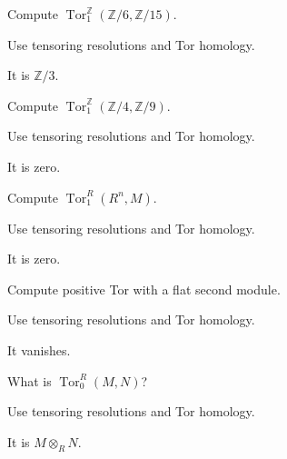 \begin{exercise}\label{exr:v26-expand-01}
Compute $\operatorname{Tor}_1^{\mathbb Z}(\mathbb Z/6,\mathbb Z/15)$.
\end{exercise}
\begin{hint}
Use tensoring resolutions and Tor homology.
\end{hint}
\begin{solution}
It is $\mathbb Z/3$.
\end{solution}

\begin{exercise}\label{exr:v26-expand-02}
Compute $\operatorname{Tor}_1^{\mathbb Z}(\mathbb Z/4,\mathbb Z/9)$.
\end{exercise}
\begin{hint}
Use tensoring resolutions and Tor homology.
\end{hint}
\begin{solution}
It is zero.
\end{solution}

\begin{exercise}\label{exr:v26-expand-03}
Compute $\operatorname{Tor}_1^R(R^n,M)$.
\end{exercise}
\begin{hint}
Use tensoring resolutions and Tor homology.
\end{hint}
\begin{solution}
It is zero.
\end{solution}

\begin{exercise}\label{exr:v26-expand-04}
Compute positive Tor with a flat second module.
\end{exercise}
\begin{hint}
Use tensoring resolutions and Tor homology.
\end{hint}
\begin{solution}
It vanishes.
\end{solution}

\begin{exercise}\label{exr:v26-expand-05}
What is $\operatorname{Tor}_0^R(M,N)$?
\end{exercise}
\begin{hint}
Use tensoring resolutions and Tor homology.
\end{hint}
\begin{solution}
It is $M\otimes_RN$.
\end{solution}

